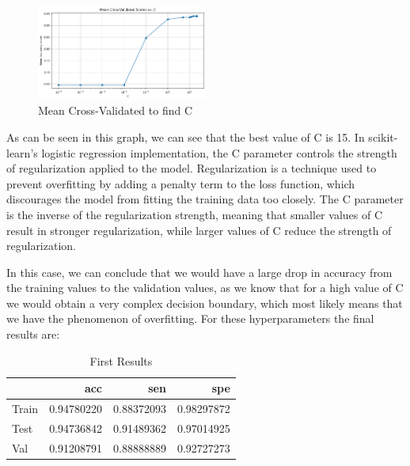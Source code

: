 \documentclass[12pt,a4paper,twocolumn]{article}
\begin{document}
\begin{figure}[H]
\includegraphics[width=0.5\textwidth]{images/CEvolOver.png}
\centering
\caption{\label{fig:CEvolOV} Mean Cross-Validated to find C}
\end{figure}
As can be seen in this graph, we can see that the best value of C is 15.
In scikit-learn's logistic regression implementation, the C parameter controls the strength of regularization applied to the model. Regularization is a technique used to prevent overfitting by adding a penalty term to the loss function, which discourages the model from fitting the training data too closely. The C parameter is the inverse of the regularization strength, meaning that smaller values of C result in stronger regularization, while larger values of C reduce the strength of regularization.

In this case, we can conclude that we would have a large drop in accuracy from the training values to the validation values, as we know that for a high value of C we would obtain a very complex decision boundary, which most likely means that we have the phenomenon of overfitting.
For these hyperparameters the final results are:
\begin{table}[h!]
\begin{tabular}{lrrr}
\toprule
{} &       acc &       sen &       spe \\
\midrule
Train	& 0.94780220	& 	0.88372093&  0.98297872\\
Test	& 0.94736842	& 	0.91489362& 0.97014925 \\
Val & 0.91208791	& 	0.88888889& 0.92727273 \\
\bottomrule
\end{tabular}
    \caption{First Results}
    \label{tab:results_1}
\end{table}
\end{document}
